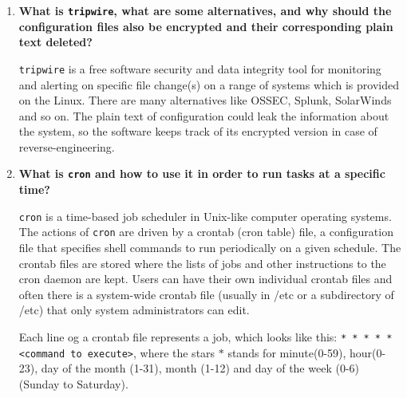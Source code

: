 \documentclass[12pt,a4paper]{article}
\theoremstyle{definition}
\begin{document}
\begin{enumerate}
	\item \textbf{What is \texttt{tripwire}, what are some alternatives, and why should the configuration files also be
	encrypted and their corresponding plain text deleted?}

	\texttt{tripwire} is a free software security and data integrity tool for monitoring and alerting on specific file change(s) on a range of systems which is provided on the Linux. There are many alternatives like OSSEC, Splunk, SolarWinds and so on. The plain text of configuration could leak the information about the system, so the software keeps track of its encrypted version in case of reverse-engineering.
	
	\item \textbf{What is \texttt{cron} and how to use it in order to run tasks at a specific time?}
	
	\texttt{cron} is a time-based job scheduler in Unix-like computer operating systems. The actions of \texttt{cron} are driven by a crontab (cron table) file, a configuration file that specifies shell commands to run periodically on a given schedule. The crontab files are stored where the lists of jobs and other instructions to the cron daemon are kept. Users can have their own individual crontab files and often there is a system-wide crontab file (usually in /etc or a subdirectory of /etc) that only system administrators can edit.
	
	Each line og a crontab file represents a job, which looks like this:
	\texttt{* * * * * <command to execute>}, where the stars $*$ stands for minute(0-59), hour(0-23), day of the month (1-31), month (1-12) and day of the week (0-6) (Sunday to Saturday).
	
\end{enumerate}
\end{document}
